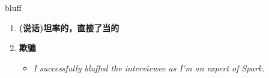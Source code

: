 
\begin{frame}
{\huge bluff}
\begin{center}
\begin{enumerate}\Large
  \item \textbf{(说话)坦率的，直接了当的}
  \item \textbf{欺骗}
  \begin{itemize}
    \item \em{\Large{I successfully bluffed the interviewee as I'm an expert of Spark.}}
  \end{itemize}
\end{enumerate}
\end{center}
\end{frame}
